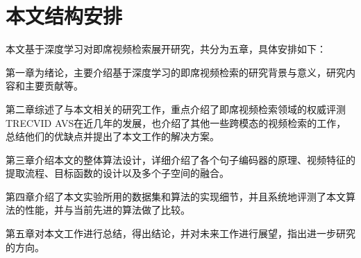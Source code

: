\section{本文结构安排}
本文基于深度学习对即席视频检索展开研究，共分为五章，具体安排如下：

第一章为绪论，主要介绍基于深度学习的即席视频检索的研究背景与意义，研究内容和主要贡献等。

第二章综述了与本文相关的研究工作，重点介绍了即席视频检索领域的权威评测TRECVID AVS在近几年的发展，也介绍了其他一些跨模态的视频检索的工作，总结他们的优缺点并提出了本文工作的解决方案。

第三章介绍本文的整体算法设计，详细介绍了各个句子编码器的原理、视频特征的提取流程、目标函数的设计以及多个子空间的融合。

第四章介绍了本文实验所用的数据集和算法的实现细节，并且系统地评测了本文算法的性能，并与当前先进的算法做了比较。

第五章对本文工作进行总结，得出结论，并对未来工作进行展望，指出进一步研究的方向。

